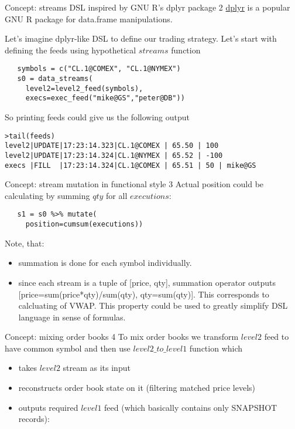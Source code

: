 \documentclass[10pt]{beamer}
\begin{document}
\begin{frame}[fragile]{Concept: streams DSL inspired by GNU R's dplyr package 2}
\href{dplyr}{dplyr} is a popular GNU R package for data.frame manipulations.

Let's imagine dplyr-like DSL to define our trading strategy. Let's start with defining the feeds using hypothetical $streams$ function
\begin{lstlisting}
   symbols = c("CL.1@COMEX", "CL.1@NYMEX")
   s0 = data_streams(
     level2=level2_feed(symbols),
     execs=exec_feed("mike@GS","peter@DB"))
\end{lstlisting}
So printing feeds could give us the following output
\begin{lstlisting}
>tail(feeds)
level2|UPDATE|17:23:14.323|CL.1@COMEX | 65.50 | 100
level2|UPDATE|17:23:14.324|CL.1@NYMEX | 65.52 | -100
execs |FILL  |17:23:14.324|CL.1@COMEX | 65.51 | 50 | mike@GS
\end{lstlisting}
\end{frame}
\begin{frame}[fragile]{Concept: stream mutation in functional style 3}
Actual position could be calculating by summing $qty$ for all $executions$:
\begin{lstlisting}
   s1 = s0 %>% mutate(
     position=cumsum(executions))
\end{lstlisting}
Note, that:
\begin{itemize}
	\item summation is done for each symbol individually.
	\item  since each stream is a tuple of [price, qty],
	summation operator outputs [price=sum(price*qty)/sum(qty), qty=sum(qty)]. This corresponds to calcluating of VWAP. This property could be used to greatly simplify DSL language in sense of formulas.
\end{itemize} 
\end{frame}

\begin{frame}[fragile]{Concept: mixing order books 4}
To mix order books we transform $level2$ feed to have common symbol and then
use $level2\_to\_level1$ function which
\begin{itemize}
	\item takes $level2$ stream as its input
	\item reconstructs order book state on it (filtering matched price levels)
	\item outputs required $level1$ feed (which basically contains only SNAPSHOT records):
\end{itemize}
\end{frame}
\end{document}
